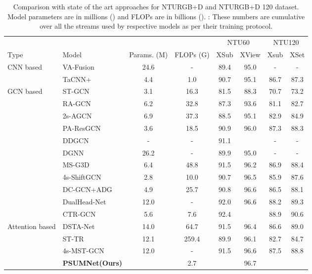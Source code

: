 \documentclass[runningheads]{llncs}
\begin{document}
\begin{table*}[!t]
  \resizebox{\textwidth}{!} 
    {\centering
  \begin{tabular}{l|l|cc|cc|cc}
    \toprule
    & & & & \multicolumn{2}{c|}{NTU60} & \multicolumn{2}{c}{NTU120}\\
    Type & Model & Params. (M)  & FLOPs (G)  &  XSub & XView & Xsub & XSet\\
    \midrule
    \multirow{2}{4em}{CNN based} & VA-Fusion \cite{zhang2019view} & 24.6 & - & 89.4 & 95.0 & - & - \\
    & TaCNN+ \cite{xu2021topology} & 4.4 & 1.0 & 90.7 & 95.1 & 86.7 & 87.3\\
    \midrule
    \multirow{10}{4em}{GCN based} & ST-GCN \cite{stgcn2018aaai} & 3.1 & 16.3 & 81.5 & 88.3 & 70.7 & 73.2 \\
    & RA-GCN \cite{song2020richly} & 6.2 & 32.8  & 87.3 & 93.6 & 81.1 & 82.7\\
    & 2s-AGCN \cite{shi2019two} & 6.9 & 37.3 & 88.5 & 95.1 & 82.9 & 84.9\\
    & PA-ResGCN\cite{song2020stronger} & 3.6 & 18.5 & 90.9 & 96.0 & 87.3 & 88.3\\
    & DDGCN\cite{korban2020ddgcn} & - & - & 91.1 &  & - & -\\
    & DGNN \cite{shi2019skeleton} & 26.2 & - & 89.9 & 95.0 & - & - \\
    & MS-G3D\cite{liu2020disentangling} & 6.4 & 48.8 & 91.5 & 96.2 & 86.9 & 88.4\\
    & 4s-ShiftGCN\cite{cheng2020shiftgcn} & 2.8 & 10.0 & 90.7 & 96.5 & 85.9 & 87.6\\
    & DC-GCN+ADG \cite{cheng2020decoupling} & 4.9 & 25.7 & 90.8 & 96.6 & 86.5 & 88.1\\
    & DualHead-Net \cite{chen2021learning} & 12.0 & - & 92.0 & 96.6 & 88.2 & 89.3\\
    & CTR-GCN \cite{chen2021channel} & 5.6 & 7.6 & 92.4 &  & 88.9 & 90.6\\
    \midrule
    \multirow{2}{4em}{Attention based} & DSTA-Net\cite{dstanet_accv2020} & 14.0 & 64.7 & 91.5 & 96.4 & 86.6 & 89.0\\
    & ST-TR \cite{plizzari2021skeleton} & 12.1 & 259.4 & 89.9 & 96.1 & 82.7 & 84.7\\
    & 4s-MST-GCN \cite{chen2021multi} & 12.0 & - & 91.5 & 96.6 & 87.5 & 88.8\\
   
    \midrule
    & \textbf{PSUMNet(Ours)} &  & 2.7 &  & 96.7 &  &  \\
    
  \bottomrule
\end{tabular}
}
\caption{\label{tab:ntu_results}Comparison with state of the art approaches for NTURGB+D and NTURGB+D 120 dataset. Model parameters are in millions () and FLOPs are in billions (). : These numbers are cumulative over all the streams used by respective models as per their training protocol.}
\end{table*}
\end{document}
